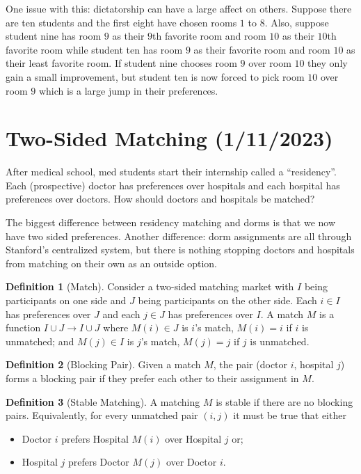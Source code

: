 \documentclass[dvipsnames]{article}
\theoremstyle{definition}
\newtheorem{definition}{Definition}[section]
\theoremstyle{remark}
\begin{document}
One issue with this: dictatorship can have a large affect on others. Suppose there are ten students and the first eight have chosen rooms $1$ to $8$. Also, suppose student nine has room $9$ as their $9$th favorite room and room $10$ as their $10$th favorite room while student ten has room $9$ as their favorite room and room $10$ as their least favorite room. If student nine chooses room $9$ over room $10$ they only gain a small improvement, but student ten is now forced to pick room $10$ over room $9$ which is a large jump in their preferences. 

\newpage

\section{Two-Sided Matching (1/11/2023)}
After medical school, med students start their internship called a ``residency''. Each (prospective) doctor has preferences over hospitals and each hospital has preferences over doctors. How should doctors and hospitals be matched?

The biggest difference between residency matching and dorms is that we now have two sided preferences. Another difference: dorm assignments are all through Stanford's centralized system, but there is nothing stopping doctors and hospitals from matching on their own as an outside option.

\begin{definition}[Match]
	Consider a two-sided matching market with $I$ being participants on one side and $J$ being participants on the other side. Each $i \in I$ has preferences over $J$ and each $j \in J$ has preferences over $I$. A match $M$ is a function $I \cup J \to I \cup J$ where $M(i) \in J$ is $i$'s match, $M(i) = i$ if $i$ is unmatched; and $M(j) \in I$ is $j$'s match, $M(j) = j$ if $j$ is unmatched. 
\end{definition}

\begin{definition}[Blocking Pair]
	Given a match $M$, the pair (doctor $i$, hospital $j$) forms a blocking pair if they prefer each other to their assignment in $M$.
\end{definition}

\begin{definition}[Stable Matching]
	A matching $M$ is stable if there are no blocking pairs. Equivalently, for every unmatched pair $(i,j)$ it must be true that either
	\begin{itemize}
		\item Doctor $i$ prefers Hospital $M(i)$ over Hospital $j$ or;
		\item Hospital $j$ prefers Doctor $M(j)$ over Doctor $i$.
	\end{itemize}
\end{definition}
\end{document}
